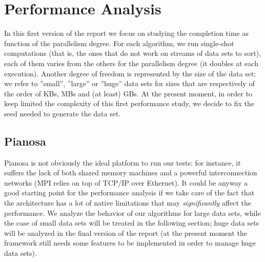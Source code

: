 \section{Performance Analysis}
In this first version of the report we focus on studying the completion time as function of the parallelism degree. For each algorithm, we run single-shot computations (that is, the ones that do not work on streams of data sets to sort), each of them varies from the others for the parallelism degree (it doubles at each execution). Another degree of freedom is represented by the size of the data set: we refer to ''small'', ''large'' or ''huge'' data sets for sizes that are respectively of the order of KBs, MBs and (at least) GBs. At the present moment, in order to keep limited the complexity of this first performance study, we decide to fix the seed needed to generate the data set.

\subsection{Pianosa}
Pianosa is not obviously the ideal platform to run our tests: for instance, it suffers the lack of both shared memory machines and a powerful interconnection networks (MPI relies on top of TCP/IP over Ethernet). It could be anyway a good starting point for the performance analysis if we take care of the fact that the architecture has a lot of native limitations that may \textit{significantly} affect the performance. We analyze the behavior of our algorithms for large data sets, while the case of small data sets will be treated in the following section; huge data sets will be analyzed in the final version of the report (at the present moment the framework still needs some features to be implemented in order to manage huge data sets).


